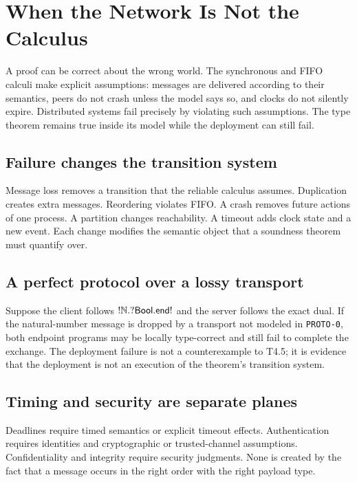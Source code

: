 \chapter{When the Network Is Not the Calculus}

A proof can be correct about the wrong world. The synchronous and FIFO calculi make explicit assumptions: messages are delivered according to their semantics, peers do not crash unless the model says so, and clocks do not silently expire. Distributed systems fail precisely by violating such assumptions. The type theorem remains true inside its model while the deployment can still fail.

\section{Failure changes the transition system}
Message loss removes a transition that the reliable calculus assumes. Duplication creates extra messages. Reordering violates FIFO. A crash removes future actions of one process. A partition changes reachability. A timeout adds clock state and a new event. Each change modifies the semantic object that a soundness theorem must quantify over.



\section{A perfect protocol over a lossy transport}
\begin{workedexample}
Suppose the client follows $!\mathbb{N}.?\mathsf{Bool}.\mathsf{end!}$ and the server follows the exact dual. If the natural-number message is dropped by a transport not modeled in \texttt{PROTO-0}, both endpoint programs may be locally type-correct and still fail to complete the exchange. The deployment failure is not a counterexample to T4.5; it is evidence that the deployment is not an execution of the theorem's transition system.
\end{workedexample}



\section{Timing and security are separate planes}
Deadlines require timed semantics or explicit timeout effects. Authentication requires identities and cryptographic or trusted-channel assumptions. Confidentiality and integrity require security judgments. None is created by the fact that a message occurs in the right order with the right payload type.

